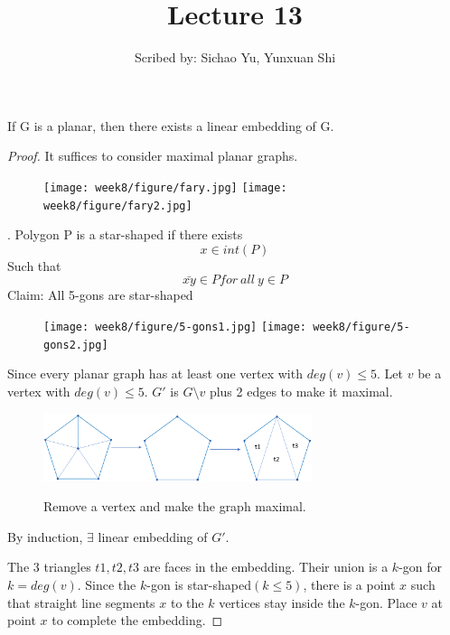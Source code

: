 \documentclass{article}
\begin{document}
  \title{Lecture 13}
  \author{Scribed by: Sichao Yu, Yunxuan Shi }
  \maketitle


  \begin{theorem}
     If G is a planar, then there exists a linear embedding of G.
  \end{theorem}
  \begin{proof}
    It suffices to consider maximal planar graphs.
  

  \begin{figure}[htp]
    \centering %
    \texttt{[image: week8/figure/fary.jpg]}
    \texttt{[image: week8/figure/fary2.jpg]}
  \end{figure}
  
  
  \begin{defination}
    . Polygon P is a star-shaped if there exists \[x\in  int(P)\] Such that \[ \bar{xy}\in P for \ all \ y \in P\]
    Claim: All 5-gons are star-shaped
   \end{defination}   
    
  \begin{figure}[htp]
    \centering %
    \texttt{[image: week8/figure/5-gons1.jpg]}
    \texttt{[image: week8/figure/5-gons2.jpg]}
  \end{figure}
    
    Since every planar graph has at least one vertex with \(deg(v)\leq 5 \).
    Let \(v\) be a vertex with \(deg(v)\leq 5 \). \(G'\) is \(G\setminus v\) plus 2 edges to make it maximal. 
    \begin{figure}[!h]
      \centering
      {\includegraphics[width=0.7\textwidth]{figure/pentagon.png}}
      \caption{Remove a vertex and make the graph maximal.}
      \label{pentagon}
    \end{figure}
    By induction, \(\exists\) linear embedding of \(G'\).
    
    
    The 3 triangles \(t1, t2, t3\) are faces in the embedding. Their union is a \(k\)-gon for \(k = deg(v)\). Since the \(k\)-gon is star-shaped\((k\leq 5)\), there is a point \(x\) such that straight line segments \(x\) to the \(k\) vertices stay inside the \(k\)-gon. Place \(v\) at point \(x\) to complete the embedding.
    \end{proof}
\end{document}
